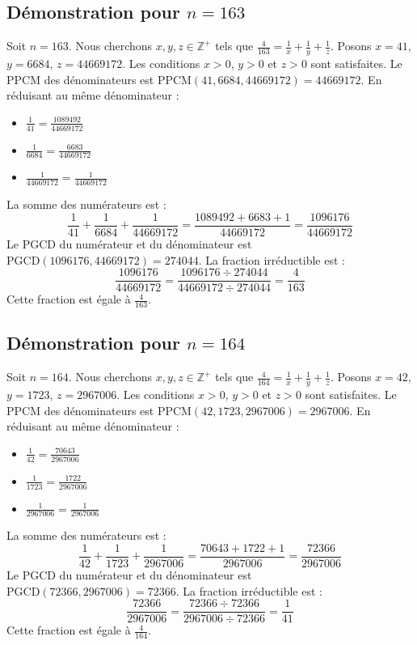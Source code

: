 \documentclass[11pt,a4paper]{article}
\begin{document}
\subsection{Démonstration pour $n = 163$}
Soit $n = 163$. Nous cherchons $x, y, z \in \mathbb{Z}^{+}$ tels que $\frac{4}{163} = \frac{1}{x} + \frac{1}{y} + \frac{1}{z}$.
Posons $x = 41$, $y = 6684$, $z = 44669172$.
Les conditions $x > 0$, $y > 0$ et $z > 0$ sont satisfaites.
Le PPCM des dénominateurs est $\text{PPCM}(41, 6684, 44669172) = 44669172$.
En réduisant au même dénominateur :
\begin{itemize}
    \item $\frac{1}{41} = \frac{1089492}{44669172}$
    \item $\frac{1}{6684} = \frac{6683}{44669172}$
    \item $\frac{1}{44669172} = \frac{1}{44669172}$
\end{itemize}
La somme des numérateurs est :
$$ \frac{1}{41} + \frac{1}{6684} + \frac{1}{44669172} = \frac{1089492 + 6683 + 1}{44669172} = \frac{1096176}{44669172} $$
Le PGCD du numérateur et du dénominateur est $\text{PGCD}(1096176, 44669172) = 274044$.
La fraction irréductible est :
$$ \frac{1096176}{44669172} = \frac{1096176 \div 274044}{44669172 \div 274044} = \frac{4}{163} $$
Cette fraction est égale à $\frac{4}{163}$.

\subsection{Démonstration pour $n = 164$}
Soit $n = 164$. Nous cherchons $x, y, z \in \mathbb{Z}^{+}$ tels que $\frac{4}{164} = \frac{1}{x} + \frac{1}{y} + \frac{1}{z}$.
Posons $x = 42$, $y = 1723$, $z = 2967006$.
Les conditions $x > 0$, $y > 0$ et $z > 0$ sont satisfaites.
Le PPCM des dénominateurs est $\text{PPCM}(42, 1723, 2967006) = 2967006$.
En réduisant au même dénominateur :
\begin{itemize}
    \item $\frac{1}{42} = \frac{70643}{2967006}$
    \item $\frac{1}{1723} = \frac{1722}{2967006}$
    \item $\frac{1}{2967006} = \frac{1}{2967006}$
\end{itemize}
La somme des numérateurs est :
$$ \frac{1}{42} + \frac{1}{1723} + \frac{1}{2967006} = \frac{70643 + 1722 + 1}{2967006} = \frac{72366}{2967006} $$
Le PGCD du numérateur et du dénominateur est $\text{PGCD}(72366, 2967006) = 72366$.
La fraction irréductible est :
$$ \frac{72366}{2967006} = \frac{72366 \div 72366}{2967006 \div 72366} = \frac{1}{41} $$
Cette fraction est égale à $\frac{4}{164}$.
\end{document}
